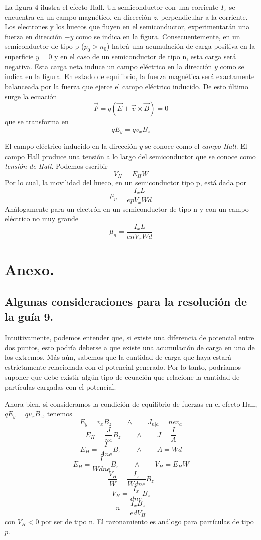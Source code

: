 \documentclass[12pt,a4paper]{article}
\begin{document}
La figura 4 ilustra el efecto Hall. Un semiconductor con una corriente $I_{x}$ se encuentra en un campo magnético, en dirección $z$, perpendicular a la corriente. Los electrones y los huecos que fluyen en el semiconductor, experimentarán una fuerza en dirección $-y$ como se indica en la figura. Consecuentemente, en un semiconductor de tipo p ($p_{0}>n_{0}$) habrá una acumulación de carga positiva en la superficie $y=0$ y en el caso de un semiconductor de tipo n, esta carga será negativa. Esta carga neta induce un campo eléctrico en la dirección $y$ como se indica en la figura. En estado de equilibrio, la fuerza magnética será exactamente balanceada por la fuerza que ejerce el campo eléctrico inducido. De esto último surge la ecuación
\[ \vec{F} =  q(\vec{E}+\vec{v} \times \vec{B}) = 0 \]
que se transforma en
\[ qE_{y}=qv_{x}B_{z} \]

El campo eléctrico inducido en la dirección $y$ se conoce como el \emph{campo Hall}. El campo Hall produce una tensión a lo largo del semiconductor que se conoce como \emph{tensión de Hall}. Podemos escribir
\[ V_{H}=E_{H}W \]
Por lo cual, la movilidad del hueco, en un semiconductor tipo p, está dada por
\[ \mu _{p} = \frac{I_{x}L}{epV_{x}Wd} \]
Análogamente para un electrón en un semiconductor de tipo n y con un campo eléctrico no muy grande
\[ \mu _{n} = \frac{I_{x}L}{enV_{x}Wd} \]

\section{Anexo.}

\subsection*{Algunas consideraciones para la resolución de la guía 9.}

Intuitivamente, podemos entender que, si existe una diferencia de potencial entre dos puntos, esto podría deberse a que existe una acumulación de carga en uno de los extremos. Más aún, sabemos que la cantidad de carga que haya estará estrictamente relacionada con el potencial generado. Por lo tanto, podríamos suponer que debe existir algún tipo de ecuación que relacione la cantidad de partículas cargadas con el potencial.

Ahora bien, si consideramos la condición de equilibrio de fuerzas en el efecto Hall, $qE_{y}=qv_{x}B_{z}$, tenemos
\[ E_{y} = v_{x} B_{z} \qquad \wedge \qquad J_{n|a}=nev_{a} \]
\[ E_{H} = \frac{J}{ne} B_{z} \qquad \wedge \qquad J=\frac{I}{A}\]
\[ E_{H} = \frac{I}{Ane} B_{z} \qquad \wedge \qquad A = Wd \]
\[ E_{H} = \frac{I}{Wdne} B_{z} \qquad \wedge \qquad V_{H}=E_{H}W \]
\[ \frac{V_{H}}{W} = \frac{I_{x}}{Wdne} B_{z} \]
\[ V_{H} = \frac{I_{x}}{dne} B_{z} \]
\[ n = \frac{I_{x} B_{z}}{edV_{H}} \]
con $V_{H}<0$ por ser de tipo n. El razonamiento es análogo para partículas de tipo $p$.
\end{document}
